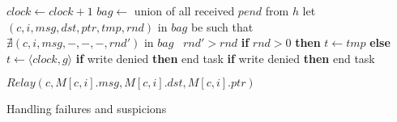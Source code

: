 \begin{algorithm}
\begin{distribalgo}[1]
\vspace{2.0mm}		
		\STATE $clock \leftarrow clock + 1$
		\STATE $bag \leftarrow$ union of all received $pend$ from $h$
			\STATE let $(c,i,msg,dst,ptr,tmp,rnd)$ in $bag$ be such that \\
				\hfill $\nexists (c,i,msg,-,-,-,rnd')$ in $bag$ \band\ $rnd' > rnd$
			\STATE \textbf{if} $rnd > 0$ \textbf{then} $t \leftarrow tmp$ \textbf{else} $t \leftarrow \langle clock,g \rangle$
				\STATE {}
				\STATE {}
				\STATE \textbf{if} write denied \textbf{then} end task
			\ENDINDENT	
		\ELSE
				\STATE {}
				\STATE \textbf{if} write denied \textbf{then} end task
			\ENDINDENT	
		\ENDIF
		\ENDINDENT
		
\ENDWHEN
\vspace{2.0mm}

		\STATE $Relay(c,M[c,i].msg,M[c,i].dst,M[c,i].ptr)$
	\ENDINDENT
\ENDWHEN
\vspace{2.0mm}

\caption{Handling failures and suspicions}
\label{alg:failures}
\end{distribalgo}
\end{algorithm}
